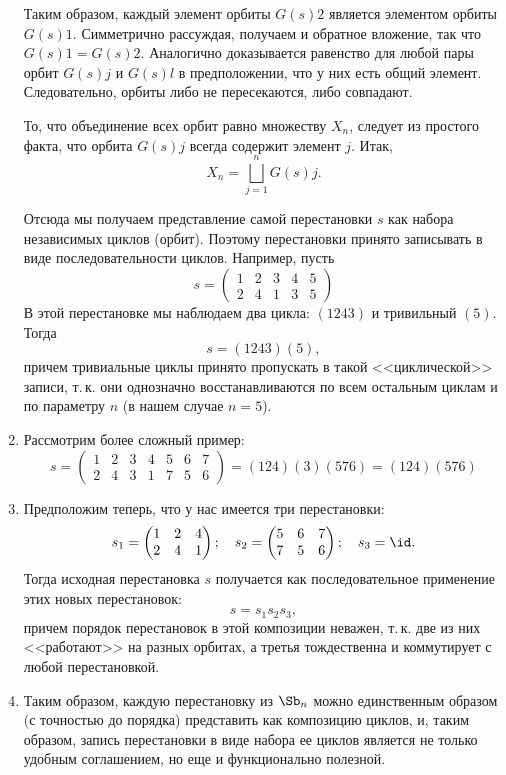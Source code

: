 \begin{enumerate}
Таким образом, каждый элемент орбиты $G(s)2$ является элементом орбиты $G(s)1$. Симметрично рассуждая, получаем и обратное вложение, так что $G(s)1=G(s)2$. Аналогично доказывается равенство для любой пары орбит $G(s)j$ и $G(s)l$ в предположении, что у них есть общий элемент. Следовательно, орбиты либо не пересекаются, либо совпадают.

То, что объединение всех орбит равно множеству $X_n$, следует из простого факта, что орбита $G(s)j$ всегда содержит элемент $j$. Итак,
$$
X_n = \bigsqcup_{j=1}^n G(s)j.
$$

Отсюда мы получаем представление самой перестановки $s$ как набора независимых циклов (орбит). Поэтому перестановки принято записывать в виде последовательности циклов. Например, пусть
$$
s=
\begin{pmatrix}
1 & 2 & 3 & 4 & 5 \\
2 & 4 & 1 & 3 & 5
\end{pmatrix}
$$
В этой перестановке мы наблюдаем два цикла: $(1 2 4 3)$ и тривильный $(5)$. Тогда
$$
s=(1 2 4 3)(5),
$$
причем тривиальные циклы принято пропускать в такой <<циклической>> записи, т.\,к. они однозначно восстанавливаются по всем остальным циклам и по параметру $n$ (в нашем случае $n=5$).
\item Рассмотрим более сложный пример:
$$
s=
\begin{pmatrix}
1 & 2 & 3 & 4 & 5 & 6 & 7 \\
2 & 4 & 3 & 1 & 7 & 5 & 6
\end{pmatrix}
=(1 2 4)(3)(5 7 6)=(1 2 4)(5 7 6)
$$

\item Предположим теперь, что у нас имеется три перестановки:
$$
s_1=
\begin{pmatrix}
1 & 2 & 4 \\
2 & 4 & 1
\end{pmatrix};
\quad s_2=
\begin{pmatrix}
5 & 6 & 7 \\
7 & 5 & 6
\end{pmatrix};
\quad s_3=\id.
$$
Тогда исходная перестановка $s$ получается как последовательное применение этих новых перестановок:
$$
s=s_1s_2s_3,
$$
причем порядок перестановок в этой композиции неважен, т.\,к. две из них <<работают>> на разных орбитах, а третья тождественна и коммутирует с любой перестановкой.

\item Таким образом, каждую перестановку из $\Sb_n$ можно единственным образом (с точностью до порядка) представить как композицию циклов, и, таким образом, запись перестановки в виде набора ее циклов является не только удобным соглашением, но еще и функционально полезной.

\end{enumerate}

